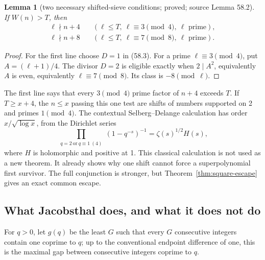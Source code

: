 \documentclass[10pt,reqno]{amsart}
\newtheorem{lemma}[theorem]{Lemma}
\theoremstyle{definition}
\newcommand{\1}{\mathbf 1}
\begin{document}
\begin{lemma}[two necessary shifted-sieve conditions; proved; source Lemma
58.2]\label{lem:shifted-sieve}
If $W(n)>T$, then
\begin{equation}\tag{58.11}
 \begin{split}
 \ell\nmid n+4&\quad(\ell\leq T,\ \ell\equiv3\pmod4,
                         \ \ell\text{ prime}),\\
 \ell\nmid n+8&\quad(\ell\leq T,\ \ell\equiv7\pmod8,
                         \ \ell\text{ prime}).
 \end{split}
\end{equation}
\end{lemma}
\begin{proof}
For the first line choose $D=1$ in (58.3).  For a prime
$\ell\equiv3\pmod4$, put $A=(\ell+1)/4$.  The divisor $D=2$ is eligible
exactly when $2\mid A^2$, equivalently $A$ is even, equivalently
$\ell\equiv7\pmod8$.  Its class is $-8\pmod\ell$.
\end{proof}
The first line says that every $3\pmod4$ prime factor of $n+4$ exceeds $T$.
If $T\geq x+4$, the $n\leq x$ passing this one test are shifts of numbers
supported on 2 and primes $1\pmod4$.  The contextual Selberg--Delange
calculation has order $x/\sqrt{\log x}$, from the Dirichlet series
\begin{equation}\tag{58.12}
 \prod_{\substack{q=2\ \mathrm{or}\ q\equiv1\ (4)}}
 (1-q^{-s})^{-1}=\zeta(s)^{1/2}H(s),
\end{equation}
where $H$ is holomorphic and positive at 1.  This classical calculation is
not used as a new theorem.  It already shows why one shift cannot force a
superpolynomial first survivor.  The full conjunction is stronger, but
Theorem~\ref{thm:square-escape} gives an exact common escape.

\subsection{What Jacobsthal does, and what it does not do}
For $q>0$, let $g(q)$ be the least $G$ such that every $G$ consecutive
integers contain one coprime to $q$; up to the conventional endpoint
difference of one, this is the maximal gap between consecutive integers
coprime to $q$.
\end{document}
